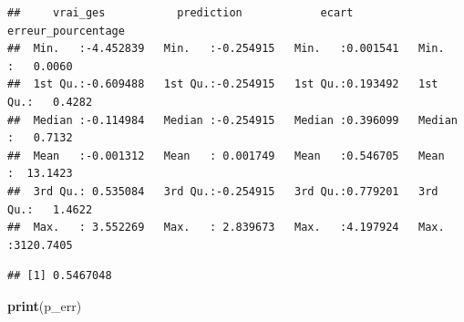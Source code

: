 \documentclass[
]{article}
\newenvironment{Shaded}{\begin{snugshade}}{\end{snugshade}}
\newcommand{\AttributeTok}[1]{\textcolor[rgb]{0.13,0.29,0.53}{#1}}
\newcommand{\FunctionTok}[1]{\textcolor[rgb]{0.13,0.29,0.53}{\textbf{#1}}}
\newcommand{\NormalTok}[1]{#1}
\newcommand{\OtherTok}[1]{\textcolor[rgb]{0.56,0.35,0.01}{#1}}
\newcommand{\SpecialCharTok}[1]{\textcolor[rgb]{0.81,0.36,0.00}{\textbf{#1}}}
\begin{document}
\begin{Shaded}
\end{Shaded}

\begin{verbatim}
##     vrai_ges           prediction            ecart          erreur_pourcentage 
##  Min.   :-4.452839   Min.   :-0.254915   Min.   :0.001541   Min.   :   0.0060  
##  1st Qu.:-0.609488   1st Qu.:-0.254915   1st Qu.:0.193492   1st Qu.:   0.4282  
##  Median :-0.114984   Median :-0.254915   Median :0.396099   Median :   0.7132  
##  Mean   :-0.001312   Mean   : 0.001749   Mean   :0.546705   Mean   :  13.1423  
##  3rd Qu.: 0.535084   3rd Qu.:-0.254915   3rd Qu.:0.779201   3rd Qu.:   1.4622  
##  Max.   : 3.552269   Max.   : 2.839673   Max.   :4.197924   Max.   :3120.7405
\end{verbatim}

\begin{Shaded}
\end{Shaded}

\begin{verbatim}
## [1] 0.5467048
\end{verbatim}

\begin{Shaded}
\begin{Highlighting}[]
\FunctionTok{print}\NormalTok{(p\_err)}
\end{Highlighting}
\end{Shaded}
\end{document}
